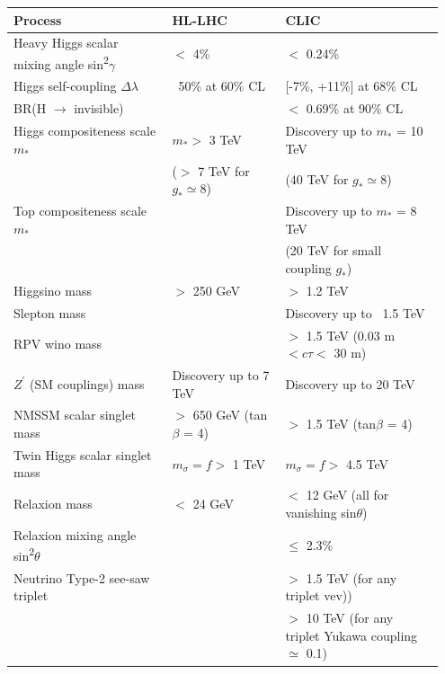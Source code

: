 \begin{table}[b]
\centering
	\begin{tabular}{p{0.35\linewidth}  p{0.25\linewidth} p{0.35\linewidth}}
	\hline \hline
	\textbf{Process} & \textbf{\acrshort{HL-LHC}} & \textbf{\acrshort{CLIC}} \\ \hline

	Heavy Higgs scalar mixing angle sin\textsuperscript{2}$\gamma$ & $<$ 4\% & $<$ 0.24\% \\
	Higgs self-coupling $\Delta \lambda$& ~50\% at 60\% CL & [-7\%, +11\%] at 68\% CL\\
	BR(H $\rightarrow$ invisible) &  & $<$ 0.69\% at 90\% CL\\ \hline

	Higgs compositeness scale $m_*$ & $m_* >$ 3 TeV & Discovery up to $m_*$ = 10 TeV\\
	 & ($>$ 7 TeV for $g_* \simeq 8$) & (40 TeV for $g_* \simeq 8$) \\ \hline

	Top compositeness scale $m_*$ &  & Discovery up to $m_*$ = 8 TeV \\
	 &  & (20 TeV for small coupling $g_*$) \\ \hline

	Higgsino mass & $>$ 250 GeV & $>$ 1.2 TeV\\
	Slepton mass &  & Discovery up to ~1.5 TeV\\
	RPV wino mass &  & $>$ 1.5 TeV (0.03 m $< c\tau <$ 30 m)\\ \hline

	$Z^{'}$ (\acrshort{SM} couplings) mass & Discovery up to 7 TeV & Discovery up to 20 TeV \\ \hline

	NMSSM scalar singlet mass & $>$ 650 GeV (tan$\beta$ = 4) &  $>$ 1.5 TeV (tan$\beta$ = 4)  \\
	Twin Higgs scalar singlet mass & $m_\sigma = f >$ 1 TeV & $m_\sigma = f >$ 4.5 TeV \\ \hline

	Relaxion mass & $<$ 24 GeV & $<$ 12 GeV (all for vanishing sin$\theta$)\\
	Relaxion mixing angle sin\textsuperscript{2}$\theta$&  & $\leq$ 2.3\% \\ \hline

	Neutrino Type-2 see-saw triplet &  & $>$ 1.5 TeV (for any triplet vev)) \\
	 & & $>$ 10 TeV (for any triplet Yukawa coupling $\simeq$ 0.1) \\ \hline


\end{tabular}
\end{table}
